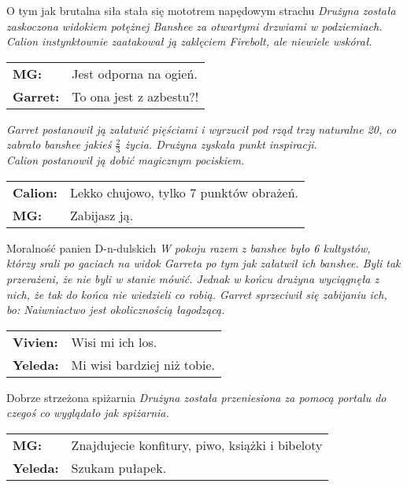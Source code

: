\documentclass[10pt,twoside,twocolumn]{book}
\begin{document}
\begin{rpg-quotebox}{O tym jak brutalna siła stała się mototrem napędowym strachu}
   \textit{Drużyna została zaskoczona widokiem potężnej Banshee za otwartymi drzwiami w podziemiach. Calion instynktownie zaatakował ją zaklęciem Firebolt, ale niewiele wskórał.}\\
   \begin{tabularx}{\columnwidth}{lX}
      \textbf{MG:} & Jest odporna na ogień.\\
      \textbf{Garret:} & To ona jest z azbestu?!\\
   \end{tabularx}
   \textit{Garret postanowił ją załatwić pięściami i wyrzucił pod rząd trzy naturalne 20, co zabrało banshee jakieś $\frac{2}{3}$ życia. Drużyna zyskała punkt inspiracji.}\\
   \textit{Calion postanowił ją dobić magicznym pociskiem.}\\
   \begin{tabularx}{\columnwidth}{lX}
      \textbf{Calion:} & Lekko chujowo, tylko 7 punktów obrażeń.\\
      \textbf{MG:} & Zabijasz ją.\\
   \end{tabularx}
\end{rpg-quotebox}


\begin{rpg-quotebox}{Moralność panien D-n-dulskich}
   \textit{W pokoju razem z banshee było 6 kultystów, którzy srali po gaciach na widok Garreta po tym jak załatwił ich banshee. Byli tak przerażeni, że nie byli w stanie mówić. Jednak w końcu drużyna wyciągnęła z nich, że tak do końca nie wiedzieli co robią. Garret sprzeciwił się zabijaniu ich, bo: Naiwniactwo jest okolicznością łagodzącą.}\\
   
   \begin{tabularx}{\columnwidth}{lX}
      \textbf{Vivien:} & Wisi mi ich los.\\
      \textbf{Yeleda:} & Mi wisi bardziej niż tobie.
   \end{tabularx}
\end{rpg-quotebox}


\begin{rpg-quotebox}{Dobrze strzeżona spiżarnia}
   \textit{Drużyna została przeniesiona za pomocą portalu do czegoś co wyglądało jak spiżarnia.}\\
   
   \begin{tabularx}{\columnwidth}{lX}
      \textbf{MG:} & Znajdujecie konfitury, piwo, książki i bibeloty\\
      \textbf{Yeleda:} & Szukam pułapek.
   \end{tabularx}
\end{rpg-quotebox}
\end{document}
